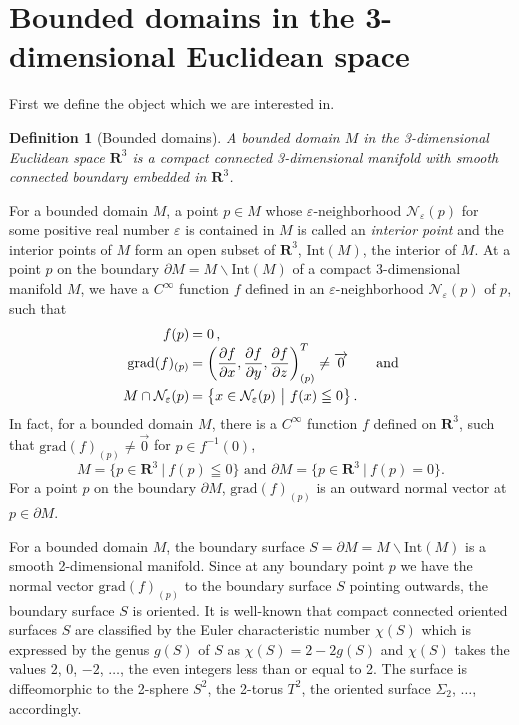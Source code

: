\documentclass{amsart}
\newtheorem{definition}[theorem]{Definition}
\numberwithin{equation}{section}
\newcommand{\ali}{\arraycolsep1pt\begin{array}{rl}}
\newcommand{\eali}{\end{array}}
\newcommand{\RR}{{\boldsymbol{R}}}
\newcommand{\op}{\mathrm}
\newcommand{\bd}{\partial}
\newcommand{\pa}{\partial}
\newcommand{\ssm}{\smallsetminus}
\newcommand{\vect}{\overrightarrow}
\begin{document}
\section{Bounded domains in the 3-dimensional Euclidean space}
\label{sec:1}

First we define the object which we are interested in.

\begin{definition}[Bounded domains]
A bounded domain $M$ in the 3-dimensional Euclidean space $\RR^3$
is a compact connected 3-dimensional manifold with smooth connected boundary embedded in $\RR^3$. 
\end{definition}

For a bounded domain $M$, a point $p\in M$ whose $\varepsilon$-neighborhood $\mathcal{N}_\varepsilon(p)$ for some positive real number $\varepsilon$ is contained in $M$ is called an {\it interior point} and the interior points of $M$ form an open subset of $\RR^3$, $\op{Int}(M)$, the interior of $M$. 
At a point $p$ on the boundary $\bd M=M\ssm \op{Int}(M)$ of a compact 3-dimensional manifold $M$, we have a $C^\infty$ function $f$ defined in an $\varepsilon$-neighborhood $\mathcal{N}_\varepsilon(p)$ of $p$, such that 
$$\ali f(p)&=0\,,\\\op{grad}(f)_{(p)}&=\left(\dfrac{\pa f}{\pa x}, \dfrac{\pa f}{\pa y},\dfrac{\pa f}{\pa z}\right)^T_{(p)}\neq\vect{0}\qquad\text{and}\\[4mm]
 M\cap \mathcal{N}_\varepsilon(p)&=\left\{x\in \mathcal{N}_\varepsilon(p)\ \big|\ f(x)\leqq0\right\}.\eali$$
In fact, for a bounded domain $M$, there is a $C^\infty$ function $f$ defined on $\RR^3$, such that  $\op{grad}(f)_{(p)}\neq \vect{0}$ for $p\in f^{-1}(0)$, 
$$ 
M=\{p\in \RR^3\ \big|\ f(p)\leqq 0\} \text{\ \ and\ \ } 
\bd M=\{p\in \RR^3\ \big|\ f(p)= 0\}.$$ 
For a point $p$ on the boundary $\bd M$, $\op{grad}(f)_{(p)}$ is an outward normal vector at $p\in \bd M$. 

For a bounded domain $M$, the boundary surface $S=\bd M=M\ssm \op{Int}(M)$ is a smooth 2-dimensional manifold. Since at any boundary point $p$ we have the normal vector $\op{grad}(f)_{(p)}$ to the boundary surface $S$ pointing outwards, the boundary surface $S$ is oriented.
It is well-known that compact connected oriented surfaces $S$ are classified by the Euler characteristic number $\chi(S)$ which is expressed by the genus $g(S)$ of $S$ as $\chi(S)=2-2g(S)$ and $\chi(S)$ takes the values $2$, $0$, $-2$, $\dots$, the even integers less than or equal to 2. The surface is diffeomorphic to the 2-sphere $S^2$, the 2-torus $T^2$, the oriented surface $\varSigma_2$, $\dots$, accordingly.
\end{document}
